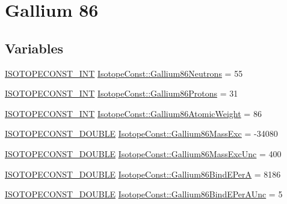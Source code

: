 \hypertarget{group___isotope_const-_gallium-_ga86}{}\section{Gallium 86}
\label{group___isotope_const-_gallium-_ga86}
\subsection*{Variables}
\begin{DoxyCompactItemize}
\item 
\mbox{\hyperlink{group___isotope_const-_macros_ga5f18360b3e99483a35c32d789e62621c}{I\+S\+O\+T\+O\+P\+E\+C\+O\+N\+S\+T\+\_\+\+I\+NT}} \mbox{\hyperlink{group___isotope_const-_gallium-_ga86_ga486fe2857b23f8c9b5a0756d82025533}{Isotope\+Const\+::\+Gallium86\+Neutrons}} = 55
\item 
\mbox{\hyperlink{group___isotope_const-_macros_ga5f18360b3e99483a35c32d789e62621c}{I\+S\+O\+T\+O\+P\+E\+C\+O\+N\+S\+T\+\_\+\+I\+NT}} \mbox{\hyperlink{group___isotope_const-_gallium-_ga86_ga06243f09b73dc71f32ca4e54384e281e}{Isotope\+Const\+::\+Gallium86\+Protons}} = 31
\item 
\mbox{\hyperlink{group___isotope_const-_macros_ga5f18360b3e99483a35c32d789e62621c}{I\+S\+O\+T\+O\+P\+E\+C\+O\+N\+S\+T\+\_\+\+I\+NT}} \mbox{\hyperlink{group___isotope_const-_gallium-_ga86_ga75003b0bea13c4e12174959b0eadc627}{Isotope\+Const\+::\+Gallium86\+Atomic\+Weight}} = 86
\item 
\mbox{\hyperlink{group___isotope_const-_macros_ga8f45a7272ce02c0b4c65c44636ed719a}{I\+S\+O\+T\+O\+P\+E\+C\+O\+N\+S\+T\+\_\+\+D\+O\+U\+B\+LE}} \mbox{\hyperlink{group___isotope_const-_gallium-_ga86_gaa484a3696349b45cf788c01b798f5ebd}{Isotope\+Const\+::\+Gallium86\+Mass\+Exc}} = -\/34080
\item 
\mbox{\hyperlink{group___isotope_const-_macros_ga8f45a7272ce02c0b4c65c44636ed719a}{I\+S\+O\+T\+O\+P\+E\+C\+O\+N\+S\+T\+\_\+\+D\+O\+U\+B\+LE}} \mbox{\hyperlink{group___isotope_const-_gallium-_ga86_ga1f95747f0d155fdfb9b049c8c3ed00bc}{Isotope\+Const\+::\+Gallium86\+Mass\+Exc\+Unc}} = 400
\item 
\mbox{\hyperlink{group___isotope_const-_macros_ga8f45a7272ce02c0b4c65c44636ed719a}{I\+S\+O\+T\+O\+P\+E\+C\+O\+N\+S\+T\+\_\+\+D\+O\+U\+B\+LE}} \mbox{\hyperlink{group___isotope_const-_gallium-_ga86_ga0052556cb54196c258099a355d12dede}{Isotope\+Const\+::\+Gallium86\+Bind\+E\+PerA}} = 8186
\item 
\mbox{\hyperlink{group___isotope_const-_macros_ga8f45a7272ce02c0b4c65c44636ed719a}{I\+S\+O\+T\+O\+P\+E\+C\+O\+N\+S\+T\+\_\+\+D\+O\+U\+B\+LE}} \mbox{\hyperlink{group___isotope_const-_gallium-_ga86_ga633e248f4ce3ee984cf7793f434195b5}{Isotope\+Const\+::\+Gallium86\+Bind\+E\+Per\+A\+Unc}} = 5

\end{DoxyCompactItemize}
